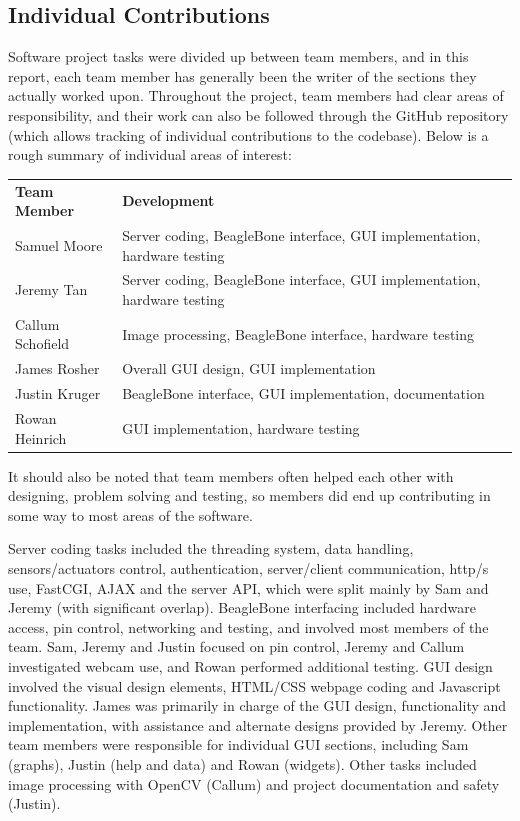 \subsection{Individual Contributions}

Software project tasks were divided up between team members, and in this report, each team member has generally been the writer of the sections they actually worked upon. Throughout the project, team members had clear areas of responsibility, and their work can also be followed through the GitHub repository (which allows tracking of individual contributions to the codebase). Below is a rough summary of individual areas of interest:

\begin{tabular}{l|l}
	{\bf Team Member} & {\bf Development} \\
	Samuel Moore & Server coding, BeagleBone interface, GUI implementation, hardware testing \\
	Jeremy Tan & Server coding, BeagleBone interface, GUI implementation, hardware testing \\
	Callum Schofield & Image processing, BeagleBone interface, hardware testing \\
	James Rosher & Overall GUI design, GUI implementation \\
	Justin Kruger & BeagleBone interface,  GUI implementation, documentation \\
	Rowan Heinrich & GUI implementation, hardware testing
\end{tabular}

It should also be noted that team members often helped each other with designing, problem solving and testing, so members did end up contributing in some way to most areas of the software.


Server coding tasks included the threading system, data handling, sensors/actuators control, authentication, server/client communication, http/s use, FastCGI, AJAX and the server API, which were split mainly by Sam and Jeremy (with significant overlap). BeagleBone interfacing included hardware access, pin control, networking and testing, and involved most members of the team. Sam, Jeremy and Justin focused on pin control, Jeremy and Callum investigated webcam use, and Rowan performed additional testing. GUI design involved the visual design elements, HTML/CSS webpage coding and Javascript functionality. James was primarily in charge of the GUI design, functionality and implementation, with assistance and alternate designs provided by Jeremy. Other team members were responsible for individual GUI sections, including Sam (graphs), Justin (help and data) and Rowan (widgets). Other tasks included image processing with OpenCV (Callum) and project documentation and safety (Justin).

